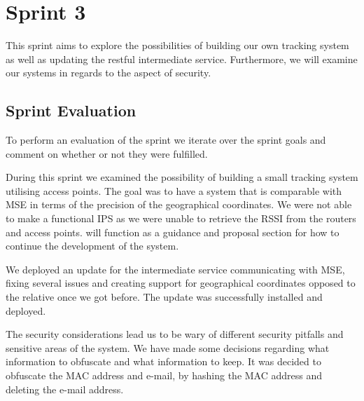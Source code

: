 \chapter{Sprint 3}\label{cha:sprint3}
This sprint aims to explore the possibilities of building our own tracking system as well as updating the restful intermediate service. Furthermore, we will examine our systems in regards to the aspect of security.




\section{Sprint Evaluation}
To perform an evaluation of the sprint we iterate over the sprint goals and comment on whether or not they were fulfilled.

During this sprint we examined the possibility of building a small tracking system utilising access points. The goal was to have a system that is comparable with MSE in terms of the precision of the geographical coordinates. We were not able to make a functional IPS as we were unable to retrieve the RSSI from the routers and access points.  will function as a guidance and proposal section for how to continue the development of the system.

We deployed an update for the intermediate service communicating with MSE, fixing several issues and creating support for geographical coordinates opposed to the relative once we got before. The update was successfully installed and deployed.

The security considerations lead us to be wary of different security pitfalls and sensitive areas of the system. We have made some decisions regarding what information to obfuscate and what information to keep. It was decided to obfuscate the MAC address and e-mail, by hashing the MAC address and deleting the e-mail address.